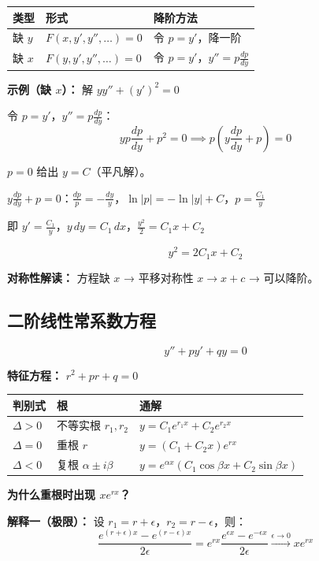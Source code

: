 \begin{center}
\begin{tabular}{p{3cm}p{4cm}p{5cm}}
\toprule
\textbf{类型} & \textbf{形式} & \textbf{降阶方法} \\
\midrule
缺 $y$ & $F(x, y', y'', \ldots) = 0$ & 令 $p = y'$，降一阶 \\
缺 $x$ & $F(y, y', y'', \ldots) = 0$ & 令 $p = y'$，$y'' = p\frac{dp}{dy}$ \\
\bottomrule
\end{tabular}
\end{center}

\textbf{示例（缺 $x$）：} 解 $yy'' + (y')^2 = 0$

令 $p = y'$，$y'' = p\frac{dp}{dy}$：
\[
yp\frac{dp}{dy} + p^2 = 0 \implies p\left(y\frac{dp}{dy} + p\right) = 0
\]

$p = 0$ 给出 $y = C$（平凡解）。

$y\frac{dp}{dy} + p = 0$：$\frac{dp}{p} = -\frac{dy}{y}$，$\ln|p| = -\ln|y| + C$，$p = \frac{C_1}{y}$

即 $y' = \frac{C_1}{y}$，$y\,dy = C_1\,dx$，$\frac{y^2}{2} = C_1 x + C_2$

\[
\boxed{y^2 = 2C_1 x + C_2}
\]

\textbf{对称性解读：} 方程缺 $x$ → 平移对称性 $x \to x + c$ → 可以降阶。

\subsection{二阶线性常系数方程}

\[
y'' + py' + qy = 0
\]

\textbf{特征方程：} $r^2 + pr + q = 0$

\begin{center}
\begin{tabular}{p{2.5cm}p{3cm}p{5cm}}
\toprule
\textbf{判别式} & \textbf{根} & \textbf{通解} \\
\midrule
$\Delta > 0$ & 不等实根 $r_1, r_2$ & $y = C_1 e^{r_1 x} + C_2 e^{r_2 x}$ \\
$\Delta = 0$ & 重根 $r$ & $y = (C_1 + C_2 x)e^{rx}$ \\
$\Delta < 0$ & 复根 $\alpha \pm i\beta$ & $y = e^{\alpha x}(C_1\cos\beta x + C_2\sin\beta x)$ \\
\bottomrule
\end{tabular}
\end{center}

\textbf{为什么重根时出现 $xe^{rx}$？}

\textbf{解释一（极限）：} 设 $r_1 = r + \epsilon$，$r_2 = r - \epsilon$，则：
\[
\frac{e^{(r+\epsilon)x} - e^{(r-\epsilon)x}}{2\epsilon} = e^{rx}\frac{e^{\epsilon x} - e^{-\epsilon x}}{2\epsilon} \xrightarrow{\epsilon \to 0} xe^{rx}
\]

